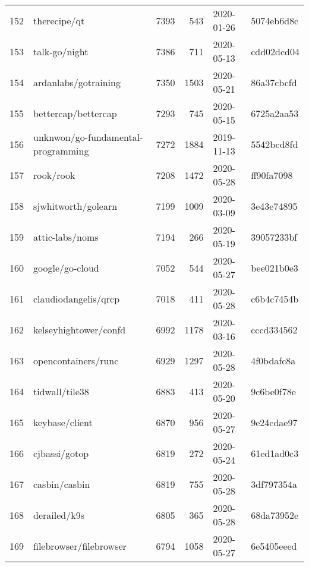 \begin{longtable}{llrrll}
    152 &                                       therecipe/qt &   7393 &    543 & 2020-01-26 &  5074eb6d8c \\
    153 &                                      talk-go/night &   7386 &    711 & 2020-05-13 &  cdd02dcd04 \\
    154 &                               ardanlabs/gotraining &   7350 &   1503 & 2020-05-21 &  86a37cbcfd \\
    155 &                                bettercap/bettercap &   7293 &    745 & 2020-05-15 &  6725a2aa53 \\
    156 &                 unknwon/go-fundamental-programming &   7272 &   1884 & 2019-11-13 &  5542bcd8fd \\
    157 &                                          rook/rook &   7208 &   1472 & 2020-05-28 &  ff90fa7098 \\
    158 &                                sjwhitworth/golearn &   7199 &   1009 & 2020-03-09 &  3e43e74895 \\
    159 &                                    attic-labs/noms &   7194 &    266 & 2020-05-19 &  39057233bf \\
    160 &                                    google/go-cloud &   7052 &    544 & 2020-05-27 &  bee021b0e3 \\
    161 &                               claudiodangelis/qrcp &   7018 &    411 & 2020-05-28 &  c6b4c7454b \\
    162 &                              kelseyhightower/confd &   6992 &   1178 & 2020-03-16 &  cccd334562 \\
    163 &                                opencontainers/runc &   6929 &   1297 & 2020-05-28 &  4f0bdafc8a \\
    164 &                                     tidwall/tile38 &   6883 &    413 & 2020-05-20 &  9c6be0f78e \\
    165 &                                     keybase/client &   6870 &    956 & 2020-05-27 &  9e24cdae97 \\
    166 &                                      cjbassi/gotop &   6819 &    272 & 2020-05-24 &  61ed1ad0c3 \\
    167 &                                      casbin/casbin &   6819 &    755 & 2020-05-28 &  3df797354a \\
    168 &                                       derailed/k9s &   6805 &    365 & 2020-05-28 &  68da73952e \\
    169 &                            filebrowser/filebrowser &   6794 &   1058 & 2020-05-27 &  6e5405eeed \\

\end{longtable}
